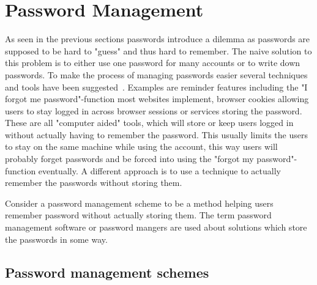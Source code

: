 \section{Password Management}
As seen in the previous sections passwords introduce a dilemma as passwords are supposed to be hard to "guess" and thus hard to remember. The naive solution to this problem is to either use one password for many accounts or to write down passwords. To make the process of managing passwords easier several techniques and tools have been suggested~\cite{management-strategies}. Examples are reminder features including the "I forgot me password"-function most websites implement, browser cookies allowing users to stay logged in across browser sessions or services storing the password. These are all "computer aided" tools, which will store or keep users logged in without actually having to remember the password. This usually limits the users to stay on the same machine while using the account, this way users will probably forget passwords and be forced into using the "forgot my password"-function eventually. A different approach is to use a technique to actually remember the passwords without storing them.
\par Consider a password management scheme to be a method helping users remember password without actually storing them. The term password management software or password mangers are used about solutions which store the passwords in some way.

\subsection{Password management schemes}
 
